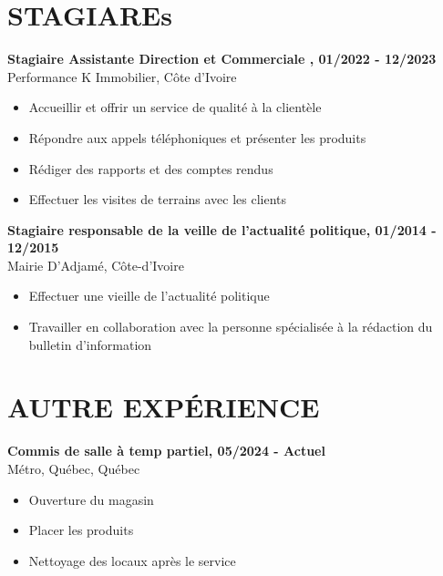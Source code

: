 \documentclass{modernsimplecv}
\begin{document}
\section*{STAGIAREs}


\textbf{Stagiaire Assistante Direction et Commerciale , 01/2022 - 12/2023}\\
Performance K Immobilier, Côte d'Ivoire
\begin{itemize}
\item Accueillir et offrir un service de qualité à la clientèle 
\item  Répondre
aux appels téléphoniques et présenter les produits
\item  Rédiger des
rapports et des comptes rendus
\item Effectuer les visites de terrains
avec les clients
\end{itemize}



\textbf{Stagiaire responsable de la veille de l'actualité politique, 01/2014
- 12/2015}\\
Mairie D'Adjamé, Côte-d'Ivoire
\begin{itemize}
\item Effectuer une vieille de l'actualité politique 
\item  Travailler en
collaboration avec la personne spécialisée à la rédaction du
bulletin d'information 
\end{itemize}





\section*{AUTRE EXPÉRIENCE}


\textbf{Commis de salle à temp partiel, 05/2024 - Actuel}\\
Métro, Québec, Québec
\begin{itemize}

\item Ouverture du magasin
\item  Placer les produits
\item  Nettoyage des locaux après le service
\end{itemize}

\end{document}
